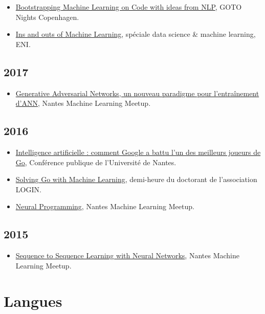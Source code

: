 \documentclass[11pt,a4paper]{moderncv}
\begin{document}
\begin{itemize}
\item
  \href{https://www.meetup.com/GOTO-Nights-CPH/events/256342503/}{Bootstrapping
    Machine Learning on Code with ideas from NLP}, GOTO Nights
  Copenhagen.
\item
  \href{https://www.mapado.com/nantes/la-matinale-de-la-data-science-et-du-machine-learning}{Ins
    and outs of Machine Learning}, spéciale data science \& machine learning, ENI.
\end{itemize}

\subsection{2017}

\begin{itemize}
\item
  \href{https://www.meetup.com/Nantes-Machine-Learning-Meetup/events/239481485/}%
  {Generative Adversarial Networks, un nouveau paradigme pour l'entraînement d'ANN},
  Nantes Machine Learning Meetup.
\end{itemize}

\subsection{2016}

\begin{itemize}
\item \href{https://youtu.be/xv2S8A1EPqI}{Intelligence artificielle : comment Google a
  battu l'un des meilleurs joueurs de Go}, Conférence publique de l'Université de Nantes.
\item \href{https://youtu.be/KuvXb2nILLc}{Solving Go with Machine
    Learning}, demi-heure du doctorant de l'association LOGIN.
\item
  \href{https://www.meetup.com/Nantes-Machine-Learning-Meetup/events/226648150/}{Neural
    Programming}, Nantes Machine Learning Meetup.
\end{itemize}

\subsection{2015}

\begin{itemize}
\item
  \href{https://www.meetup.com/Nantes-Machine-Learning-Meetup/events/221108033/}{Sequence
    to Sequence Learning with Neural Networks}, Nantes
  Machine Learning Meetup.
\end{itemize}

\section{Langues}
\end{document}
